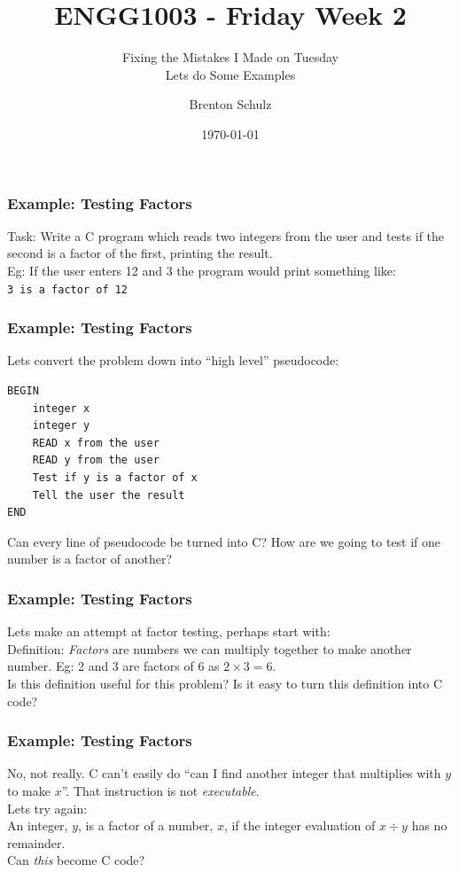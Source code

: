 \documentclass[14pt]{beamer}
\title{ENGG1003 - Friday Week 2}
\subtitle{Fixing the Mistakes I Made on Tuesday\\Lets do Some Examples}
\author{Brenton Schulz}
\institute{University of Newcastle}
\date{\today}
\begin{document}
\titlepage

\begin{frame}
\frametitle{Example: Testing Factors}
Task: Write a C program which reads two integers from the user and tests if the second is a factor of the first, printing the result.\\
\vspace{5mm}
Eg: If the user enters 12 and 3 the program would print something like:\\
\texttt{3 is a factor of 12}
\end{frame}

\begin{frame}[fragile]
\frametitle{Example: Testing Factors}
Lets convert the problem down into ``high level'' pseudocode:
\begin{lstlisting}[style=pseudo]
BEGIN
	integer x
	integer y
	READ x from the user
	READ y from the user
	Test if y is a factor of x
	Tell the user the result
END
\end{lstlisting}
Can every line of pseudocode be turned into C? How are we going to test if one number is a factor of another?
\end{frame}

\begin{frame}
\frametitle{Example: Testing Factors}
Lets make an attempt at factor testing, perhaps start with:\\
\vspace{5mm}
Definition: \textit{Factors} are numbers we can multiply together to make another number. Eg: 2 and 3 are factors of 6 as $2 \times 3 = 6$.\\
\vspace{5mm}
Is this definition useful for this problem? Is it easy to turn this definition into C code?
\end{frame}

\begin{frame}
\frametitle{Example: Testing Factors}
No, not really. C can't easily do ``can I find another integer that multiplies with $y$ to make $x$''. That instruction is not \textit{executable}. \\
\vspace{5mm}
Lets try again: \\
\vspace{5mm}
An integer, $y$, is a factor of a number, $x$, if the integer evaluation of $x\div y$ has no remainder.\\
\vspace{5mm}
Can \textit{this} become C code?
\end{frame}
\end{document}
